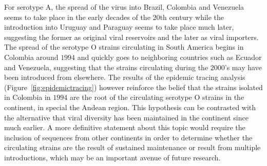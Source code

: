 \documentclass[10pt]{article}
\begin{document}
For serotype A, the spread of the virus into  Brazil, Colombia and Venezuela seems to take place in the early decades of the 20th century while the introduction into Uruguay and Paraguay seems to take place much later, suggesting the former as original viral reservoirs and the later as viral importers.
The spread of the serotype O strains  circulating in South America begins in Colombia around $1994$ and quickly goes to neighboring countries such as Ecuador and Venezuela, suggesting that the strains circulating during the $2000$'s may have been introduced from elsewhere.
The results of the epidemic tracing analysis (Figure~\ref{fig:epidemictracing}) however reinforce the belief that the strains isolated in Colombia in $1994$ are the root of the circulating serotype O strains in the continent, in special the Andean region.
This hypothesis can be contrasted with the alternative that viral diversity has been maintained in the continent since much earlier. 
A more definitive statement about this topic would require the inclusion of sequences from other continents in order to determine whether the circulating strains are the result of sustained maintenance or result from multiple introductions, which may be an important avenue of future research.
%
\end{document}
